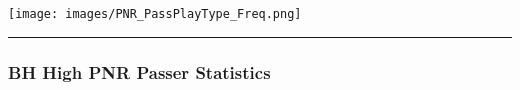 \documentclass[a4paper,12pt]{article}
\begin{document}
\begin{table}[H]
{\begin{minipage}[t]{0.6\textwidth}
{\begin{tabular}
            
                
            
                
            
                
            
                
            
                
            
                
            
                
            
                
            
                
            
                
            
                
            
                
            
                
            
                
            
                
            
                
            
                
            

            \bottomrule
        \end{tabular}
        }
    \end{minipage}
    }
    \hfill %
    \begin{minipage}[c]{0.35\textwidth} %
        \flushright
        \texttt{[image: images/PNR\_PassPlayType\_Freq.png]} %
    \end{minipage}
\end{table}

\vspace{-1em} %
\hrule height 1pt width 1\textwidth %
\vspace{1em} %

\subsubsection{BH High PNR Passer Statistics}
\end{document}
